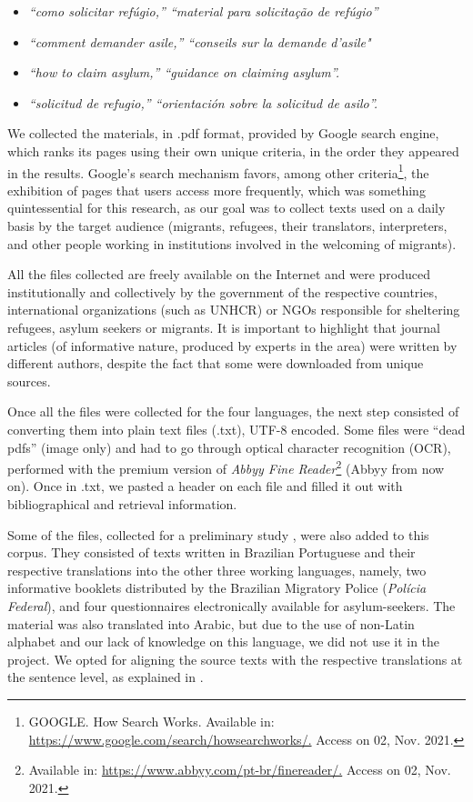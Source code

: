 \documentclass[english]{textolivre}
\begin{document}
\begin{itemize}
\item \textit{“como solicitar refúgio,” “material para solicitação de refúgio”}
\item \textit{“comment demander asile,” “conseils sur la demande d'asile"}
\item \textit{“how to claim asylum,” “guidance on claiming asylum”.}
\item \textit{“solicitud de refugio,” “orientación sobre la solicitud de asilo”.}
\end{itemize}

We collected the materials, in .pdf format, provided by Google search engine, which ranks its pages using their own unique criteria, in the order they appeared in the results. Google’s search mechanism favors, among other criteria\footnote{GOOGLE. How Search Works. Available in: \url{https://www.google.com/search/howsearchworks/.} Access on 02, Nov. 2021.}, the exhibition of pages that users access more frequently, which was something quintessential for this research, as our goal was to collect texts used on a daily basis by the target audience (migrants, refugees, their translators, interpreters, and other people working in institutions involved in the welcoming of migrants).

All the files collected are freely available on the Internet and were produced institutionally and collectively by the government of the respective countries, international organizations (such as UNHCR) or NGOs responsible for sheltering refugees, asylum seekers or migrants. It is important to highlight that journal articles (of informative nature, produced by experts in the area) were written by different authors, despite the fact that some were downloaded from unique sources.

Once all the files were collected for the four languages, the next step consisted of converting them into plain text files (.txt), UTF-8 encoded. Some files were “dead pdfs” (image only) and had to go through optical character recognition (OCR), performed with the premium version of \textit{Abbyy Fine Reader}\footnote{ Available in: \url{https://www.abbyy.com/pt-br/finereader/.} Access on 02, Nov. 2021.}  (Abbyy from now on). Once in .txt, we pasted a header on each file and filled it out with bibliographical and retrieval information.

Some of the files, collected for a preliminary study \cite{furtado_primeiros_2017,furtado_compilacao_2019}, were also added to this corpus. They consisted of texts written in Brazilian Portuguese and their respective translations into the other three working languages, namely, two informative booklets distributed by the Brazilian Migratory Police (\textit{Polícia Federal}), and four questionnaires electronically available for asylum-seekers. The material was also translated into Arabic, but due to the use of non-Latin alphabet and our lack of knowledge on this language, we did not use it in the project. We opted for aligning the source texts with the respective translations at the sentence level, as explained in \textcite{furtado_compilacao_2019}.
\end{document}
